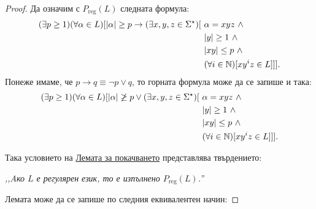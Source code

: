 \begin{proof}
  Да означим с $P_{\text{reg}}(L)$ следната формула:
  \begin{align*}
    (\exists p \geq 1)(\forall \alpha \in L)[\lvert{\alpha}\rvert \geq p \to (\exists x,y,z\in\Sigma^\star)[\ & \alpha = xyz\ \land \\
                                                                                                              & \lvert{y}\rvert \geq 1\ \land\\
                                                                                                              & \lvert{xy}\rvert \leq p\ \land\\
                                                                                                              & (\forall i\in\mathbb{N})[xy^iz \in L]]].
  \end{align*}
  Понеже имаме, че $p \to q \equiv \neg p \lor q$, то горната формула може да се запише и така:
  \begin{align*}
    (\exists p \geq 1)(\forall \alpha \in L)[ \lvert{\alpha}\rvert \not\geq p \lor (\exists x,y,z\in\Sigma^\star)[\ & \alpha = xyz\ \land \\
                                                                                                            & \lvert{y}\rvert \geq 1\ \land\\
                                                                                                            & \lvert{xy}\rvert \leq p\ \land\\
                                                                                                            & (\forall i\in\mathbb{N})[xy^iz \in L]]].
  \end{align*}
  
  Така условието на \hyperref[lem:pumping-reg]{Лемата за покачването} представлява твърдението:
  \begin{center}
    {\em ,,Aко $L$ е регулярен език, то е изпълнено $P_{\text{reg}}(L)$.''}
  \end{center}
  \noindent
  Лемата може да се запише по следния еквивалентен начин:
  

\end{proof}
